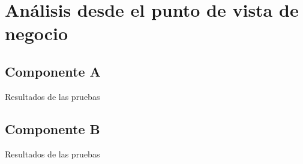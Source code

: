 \section{Análisis desde el punto de vista de negocio}
\label{section:analisis-negocio}

\subsection{Componente A}
Resultados de las pruebas

\subsection{Componente B}
Resultados de las pruebas
